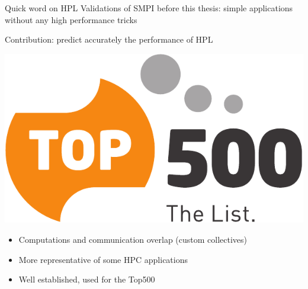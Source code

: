 \documentclass[10pt]{beamer}
\begin{document}
\begin{frame}[fragile]{Quick word on HPL}
    Validations of SMPI before this thesis: simple applications without any high performance tricks
    \pause

    Contribution: predict accurately the performance of HPL

    \begin{minipage}[b][0.2\textheight][c]{.2\linewidth}
        \includegraphics[width=\linewidth]{img/slides/top_500.pdf}
    \end{minipage} \hfill %
    \begin{minipage}[b][0.25\textheight][t]{0.78\linewidth}
        \begin{itemize}
            \item Computations and communication overlap (custom collectives)
            \item More representative of some HPC applications
            \item Well established, used for the Top500
        \end{itemize}
    \end{minipage}
    \vfill
    \pause


\end{frame}
\end{document}
